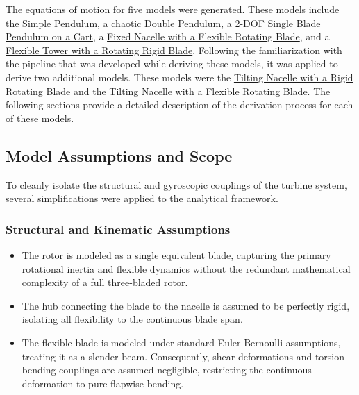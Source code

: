 \documentclass[final,onecolumn]{IEEEtran}
\begin{document}
The equations of motion for five models were generated. These models include the \hyperref[app:simple_pendulum]{Simple Pendulum}, a chaotic \hyperref[app:double_pendulum]{Double Pendulum}, a 2-DOF \hyperref[app:pendulum_cart]{Single Blade Pendulum on a Cart}, a \hyperref[app:fixed_nacelle_flex_blade]{Fixed Nacelle with a Flexible Rotating Blade}, and a \hyperref[app:flex_tower_rigid_blade]{Flexible Tower with a Rotating Rigid Blade}. Following the familiarization with the pipeline that was developed while deriving these models, it was applied to derive two additional models. These models were the \hyperref[sec:tilting_nacelle_rigid_blade]{Tilting Nacelle with a Rigid Rotating Blade} and the \hyperref[sec:tilting_nacelle_flex_blade]{Tilting Nacelle with a Flexible Rotating Blade}. The following sections provide a detailed description of the derivation process for each of these models.

\subsection{Model Assumptions and Scope}\label{sec:assumptions}
To cleanly isolate the structural and gyroscopic couplings of the turbine system, several simplifications were applied to the analytical framework.

\subsubsection*{Structural and Kinematic Assumptions}
\begin{itemize}
    \item The rotor is modeled as a single equivalent blade, capturing the primary rotational inertia and flexible dynamics without the redundant mathematical complexity of a full three-bladed rotor.
    \item The hub connecting the blade to the nacelle is assumed to be perfectly rigid, isolating all flexibility to the continuous blade span.
    \item The flexible blade is modeled under standard Euler-Bernoulli assumptions, treating it as a slender beam. Consequently, shear deformations and torsion-bending couplings are assumed negligible, restricting the continuous deformation to pure flapwise bending.
\end{itemize}
\end{document}
